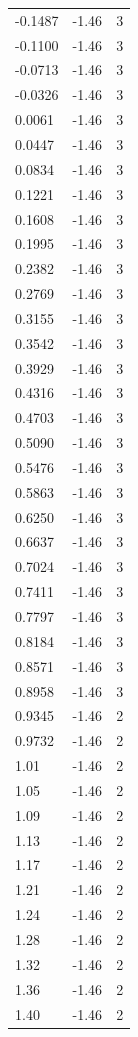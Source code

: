 \begin{longtable}{lrr}
  -0.1487 & -1.46 & 3 \\
  -0.1100 & -1.46 & 3 \\
  -0.0713 & -1.46 & 3 \\
  -0.0326 & -1.46 & 3 \\
  0.0061 & -1.46 & 3 \\
  0.0447 & -1.46 & 3 \\
  0.0834 & -1.46 & 3 \\
  0.1221 & -1.46 & 3 \\
  0.1608 & -1.46 & 3 \\
  0.1995 & -1.46 & 3 \\
  0.2382 & -1.46 & 3 \\
  0.2769 & -1.46 & 3 \\
  0.3155 & -1.46 & 3 \\
  0.3542 & -1.46 & 3 \\
  0.3929 & -1.46 & 3 \\
  0.4316 & -1.46 & 3 \\
  0.4703 & -1.46 & 3 \\
  0.5090 & -1.46 & 3 \\
  0.5476 & -1.46 & 3 \\
  0.5863 & -1.46 & 3 \\
  0.6250 & -1.46 & 3 \\
  0.6637 & -1.46 & 3 \\
  0.7024 & -1.46 & 3 \\
  0.7411 & -1.46 & 3 \\
  0.7797 & -1.46 & 3 \\
  0.8184 & -1.46 & 3 \\
  0.8571 & -1.46 & 3 \\
  0.8958 & -1.46 & 3 \\
  0.9345 & -1.46 & 2 \\
  0.9732 & -1.46 & 2 \\
  1.01 & -1.46 & 2 \\
  1.05 & -1.46 & 2 \\
  1.09 & -1.46 & 2 \\
  1.13 & -1.46 & 2 \\
  1.17 & -1.46 & 2 \\
  1.21 & -1.46 & 2 \\
  1.24 & -1.46 & 2 \\
  1.28 & -1.46 & 2 \\
  1.32 & -1.46 & 2 \\
  1.36 & -1.46 & 2 \\
  1.40 & -1.46 & 2 \\

\end{longtable}

